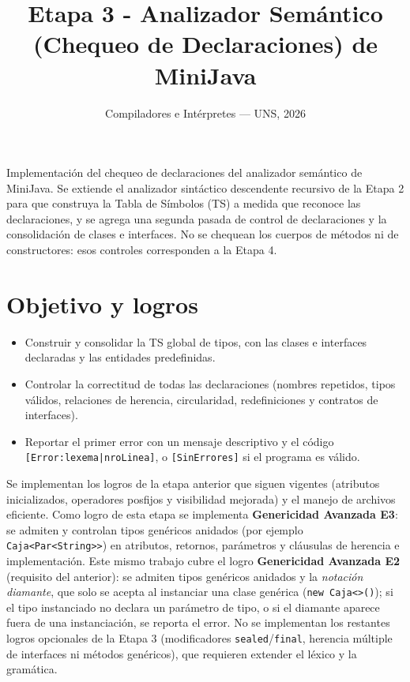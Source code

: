 \documentclass[11pt,a4paper]{article}
\title{Etapa 3 - Analizador Semántico (Chequeo de Declaraciones) de MiniJava}
\author{Compiladores e Intérpretes --- UNS, 2026}
\date{}
\begin{document}
\sloppy

\maketitle

\noindent
Implementación del chequeo de declaraciones del analizador semántico de MiniJava.
Se extiende el analizador sintáctico descendente recursivo de la Etapa 2 para que
construya la Tabla de Símbolos (TS) a medida que reconoce las declaraciones, y se
agrega una segunda pasada de control de declaraciones y la consolidación de clases
e interfaces. No se chequean los cuerpos de métodos ni de constructores: esos
controles corresponden a la Etapa 4.

\section{Objetivo y logros}

\begin{itemize}
  \item Construir y consolidar la TS global de tipos, con las clases e interfaces
        declaradas y las entidades predefinidas.
  \item Controlar la correctitud de todas las declaraciones (nombres repetidos,
        tipos válidos, relaciones de herencia, circularidad, redefiniciones y
        contratos de interfaces).
  \item Reportar el primer error con un mensaje descriptivo y el código
        \texttt{[Error:lexema|nroLinea]}, o \texttt{[SinErrores]} si el programa
        es válido.
\end{itemize}

Se implementan los logros de la etapa anterior que siguen vigentes (atributos
inicializados, operadores posfijos y visibilidad mejorada) y el manejo de archivos
eficiente. Como logro de esta etapa se implementa \textbf{Genericidad Avanzada E3}:
se admiten y controlan tipos genéricos anidados (por ejemplo
\texttt{Caja<Par<String>>}) en atributos, retornos, parámetros y cláusulas de
herencia e implementación. Este mismo trabajo cubre el logro
\textbf{Genericidad Avanzada E2} (requisito del anterior): se admiten tipos genéricos
anidados y la \emph{notación diamante}, que solo se acepta al instanciar una clase
genérica (\texttt{new Caja<>()}); si el tipo instanciado no declara un parámetro de
tipo, o si el diamante aparece fuera de una instanciación, se reporta el error. No se
implementan los restantes logros opcionales de la Etapa 3 (modificadores
\texttt{sealed}/\texttt{final}, herencia múltiple de interfaces ni métodos
genéricos), que requieren extender el léxico y la gramática.
\end{document}
